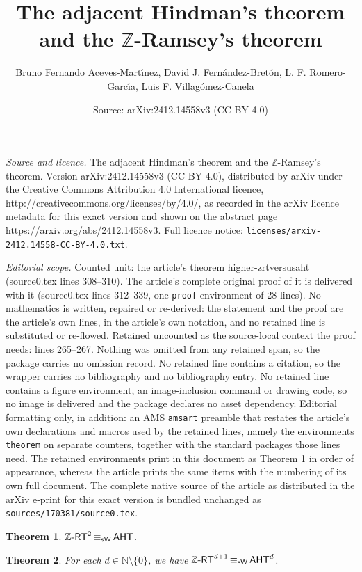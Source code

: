 \documentclass[10pt,a4paper]{amsart}
\title{The adjacent Hindman's theorem and the $\mathbb Z$-Ramsey's theorem}
\author{Bruno Fernando Aceves-Mart\'{\i}nez, David J. Fern\'andez-Bret\'on, L. F. Romero-Garc\'{\i}a, Luis F. Villag\'omez-Canela}
\date{Source: arXiv:2412.14558v3 (CC BY 4.0)}
\newtheorem{theorem}{Theorem}
\newcommand{\aht}{\mathnormal{\mathsf{AHT}}}
\newcommand{\weiseq}{\mathop{\equiv_{\mathrm{s}\mathsf{W}}}}
\newcommand{\zrt}{\mathnormal{\mathbb Z\text{-}\mathsf{RT}}}
\begin{document}
\maketitle

\noindent\emph{Source and licence.} The adjacent Hindman's theorem and the $\mathbb Z$-Ramsey's theorem. Version arXiv:2412.14558v3 (CC BY 4.0), distributed by arXiv under the Creative Commons Attribution 4.0 International licence, http://creativecommons.org/licenses/by/4.0/, as recorded in the arXiv licence metadata for this exact version and shown on the abstract page https://arxiv.org/abs/2412.14558v3. Full licence notice: \texttt{licenses/arxiv-2412.14558-CC-BY-4.0.txt}.\par\smallskip

\noindent\textit{Editorial scope.} Counted unit: the article's theorem higher-zrtversusaht (source0.tex lines 308--310). The article's complete original proof of it is delivered with it (source0.tex lines 312--339, one \texttt{proof} environment of 28 lines). No mathematics is written, repaired or re-derived: the statement and the proof are the article's own lines, in the article's own notation, and no retained line is substituted or re-flowed.  Retained uncounted as the source-local context the proof needs: lines 265--267.  Nothing was omitted from any retained span, so the package carries no omission record.  No retained line contains a citation, so the wrapper carries no bibliography and no bibliography entry.  No retained line contains a figure environment, an image-inclusion command or drawing code, so no image is delivered and the package declares no asset dependency.  Editorial formatting only, in addition: an AMS \texttt{amsart} preamble that restates the article's own declarations and macros used by the retained lines, namely the environments \texttt{theorem} on separate counters, together with the standard packages those lines need.  The retained environments print in this document as Theorem 1 in order of appearance, whereas the article prints the same items with the numbering of its own full document.  The complete native source of the article as distributed in the arXiv e-print for this exact version is bundled unchanged as \texttt{sources/170381/source0.tex}.
\begin{theorem}\label{zrtversusaht}
$\zrt^2\weiseq\aht$.
\end{theorem}

\begin{theorem}\label{higher-zrtversusaht}
For each $d\in\mathbb N\setminus\{0\}$, we have $\zrt^{d+1}\weiseq\aht^d$.
\end{theorem}
\end{document}
